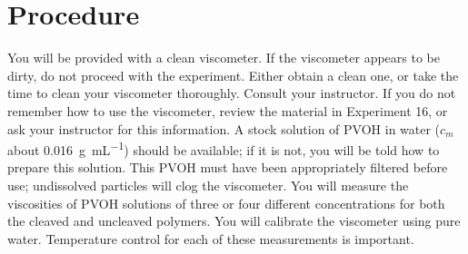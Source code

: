 \documentclass[nobib,nofonts,nols,nohyper]{tufte-handout}
\begin{document}
\section{Procedure} %
\label{sec:procedure}

You will be provided with a clean viscometer. 
If the viscometer appears to be dirty, do not proceed with the experiment. 
Either obtain a clean one, or take the time to clean your viscometer thoroughly. 
Consult your instructor. 
If you do not remember how to use the viscometer, review the material in Experiment 16, or ask your instructor for this information. 
A stock solution of PVOH in water (\( c_m \) about \SI{0.016}{\g \per \mL}) should be available; if it is not, you will be told how to prepare this solution. 
This PVOH must have been appropriately filtered before use; undissolved particles will clog the viscometer. 
You will measure the viscosities of PVOH solutions of three or four different concentrations for both the cleaved and uncleaved polymers. 
You will calibrate the viscometer using pure water. 
Temperature control for each of these measurements is important.
\end{document}

